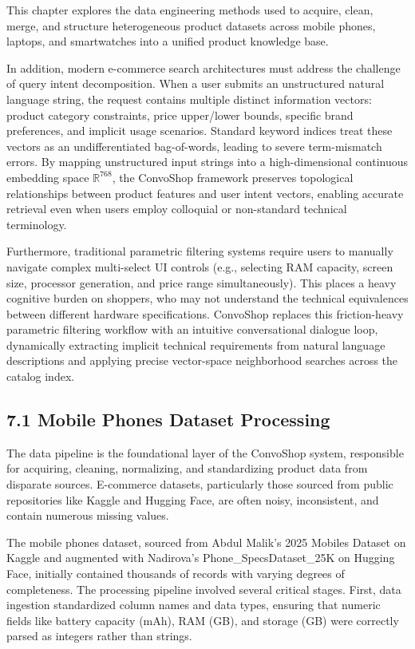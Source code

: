 \documentclass[12pt,a4paper]{article}
\begin{document}
This chapter explores the data engineering methods used to acquire, clean, merge, and structure heterogeneous product datasets across mobile phones, laptops, and smartwatches into a unified product knowledge base.



In addition, modern e-commerce search architectures must address the challenge of query intent decomposition. When a user submits an unstructured natural language string, the request contains multiple distinct information vectors: product category constraints, price upper/lower bounds, specific brand preferences, and implicit usage scenarios. Standard keyword indices treat these vectors as an undifferentiated bag-of-words, leading to severe term-mismatch errors. By mapping unstructured input strings into a high-dimensional continuous embedding space $\mathbb{R}^{768}$, the ConvoShop framework preserves topological relationships between product features and user intent vectors, enabling accurate retrieval even when users employ colloquial or non-standard technical terminology.

Furthermore, traditional parametric filtering systems require users to manually navigate complex multi-select UI controls (e.g., selecting RAM capacity, screen size, processor generation, and price range simultaneously). This places a heavy cognitive burden on shoppers, who may not understand the technical equivalences between different hardware specifications. ConvoShop replaces this friction-heavy parametric filtering workflow with an intuitive conversational dialogue loop, dynamically extracting implicit technical requirements from natural language descriptions and applying precise vector-space neighborhood searches across the catalog index.

\subsection*{7.1 Mobile Phones Dataset Processing}
\label{sec:7.1}
The data pipeline is the foundational layer of the ConvoShop system, responsible for acquiring, cleaning, normalizing, and standardizing product data from disparate sources. E-commerce datasets, particularly those sourced from public repositories like Kaggle and Hugging Face, are often noisy, inconsistent, and contain numerous missing values.

The mobile phones dataset, sourced from Abdul Malik's 2025 Mobiles Dataset on Kaggle and augmented with Nadirova's Phone\_SpecsDataset\_25K on Hugging Face, initially contained thousands of records with varying degrees of completeness. The processing pipeline involved several critical stages. First, data ingestion standardized column names and data types, ensuring that numeric fields like battery capacity (mAh), RAM (GB), and storage (GB) were correctly parsed as integers rather than strings.
\end{document}
